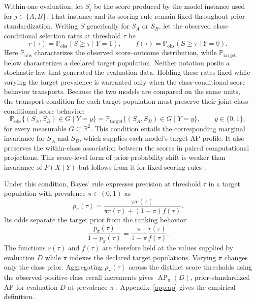 \documentclass[11pt]{article}
\newcommand{\AP}{\operatorname{AP}}
\newcommand{\Prb}{\mathbb{P}}
\theoremstyle{remark}
\begin{document}
Within one evaluation, let $S_j$ be the score produced by the model instance used for $j\in\{A,B\}$. That instance and its scoring rule remain fixed throughout prior standardization. Writing $S$ generically for $S_A$ or $S_B$, let the observed class-conditional selection rates at threshold $\tau$ be
\[
r(\tau)=\Prb_{\mathrm{obs}}(S\geq \tau\mid Y=1),
\qquad
f(\tau)=\Prb_{\mathrm{obs}}(S\geq \tau\mid Y=0).
\]
Here $\Prb_{\mathrm{obs}}$ characterizes the observed score--outcome
distribution, while $\Prb_{\mathrm{target}}$ below characterizes a declared
target population. Neither notation posits a stochastic law that generated the
evaluation data.
Holding these rates fixed while varying the target prevalence is warranted only when the class-conditional score behavior transports. Because the two models are compared on the same units, the transport condition for each target population must preserve their joint class-conditional score behavior:
\begin{equation}
\Prb_{\mathrm{obs}}\{(S_A,S_B)\in G\mid Y=y\}
=
\Prb_{\mathrm{target}}\{(S_A,S_B)\in G\mid Y=y\},
\qquad y\in\{0,1\},
\label{eq:score-invariance}
\end{equation}
for every measurable $G\subseteq\mathbb R^2$. This condition entails the corresponding marginal invariance for $S_A$ and $S_B$, which supplies each model's target AP profile. It also preserves the within-class association between the scores in paired computational projections. This score-level form of prior-probability shift is weaker than invariance of $P(X\mid Y)$ but follows from it for fixed scoring rules \cite{saerens2002adjusting,storkey2009training,lipton2018detecting}.

Under this condition, Bayes' rule expresses precision at threshold $\tau$ in a target population with prevalence $\pi\in(0,1)$ as
\begin{equation}
p_\pi(\tau)
=
\frac{\pi r(\tau)}
{\pi r(\tau)+(1-\pi)f(\tau)}.
\label{eq:reference-precision}
\end{equation}
Its odds separate the target prior from the ranking behavior:
\begin{equation}
\frac{p_\pi(\tau)}{1-p_\pi(\tau)}
=
\frac{\pi}{1-\pi}\frac{r(\tau)}{f(\tau)}.
\label{eq:precision-odds}
\end{equation}
The functions $r(\tau)$ and $f(\tau)$ are therefore held at the values supplied by evaluation $D$ while $\pi$ indexes the declared target populations. Varying $\pi$ changes only the class prior. Aggregating $p_\pi(\tau)$ across the distinct score thresholds using the observed positive-class recall increments gives $\AP_\pi(D)$, prior-standardized AP for evaluation $D$ at prevalence $\pi$ \cite{elkan2001foundations,siblini2020calibration}. Appendix~\ref{app:ap} gives the empirical definition.
\end{document}
